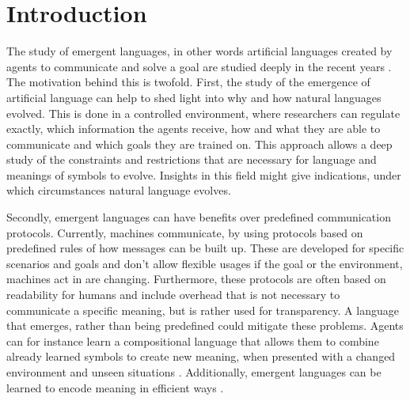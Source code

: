 \section{Introduction}
\label{sec:introduction}

The study of emergent languages, in other words artificial languages created by agents to communicate and solve a goal are studied deeply in the recent years \citep{Kirby2002,Kirby2008,Steels2009,Lazaridou2017,Baroni2020,Baroni2022}.
The motivation behind this is twofold.
First, the study of the emergence of artificial language can help to shed light into why and how natural languages evolved.
This is done in a controlled environment, where researchers can regulate exactly, which information the agents receive, how and what they are able to communicate and which goals they are trained on.
This approach allows a deep study of the constraints and restrictions that are necessary for language and meanings of symbols to evolve.
Insights in this field might give indications, under which circumstances natural language evolves.

Secondly, emergent languages can have benefits over predefined communication protocols.
Currently, machines communicate, by using protocols based on predefined rules of how messages can be built up.
These are developed for specific scenarios and goals and don't allow flexible usages if the goal or the environment, machines act in are changing.
Furthermore, these protocols are often based on readability for humans and include overhead that is not necessary to communicate a specific meaning, but is rather used for transparency.
A language that emerges, rather than being predefined could mitigate these problems.
Agents can for instance learn a compositional language that allows them to combine already learned symbols to create new meaning, when presented with a changed environment and unseen situations \citep{Kharitonov2020,Lazaridou2018,Gupta2020}.
Additionally, emergent languages can be learned to encode meaning in efficient ways \citep{Chaabouni2019,Zaslavsky2018}.


